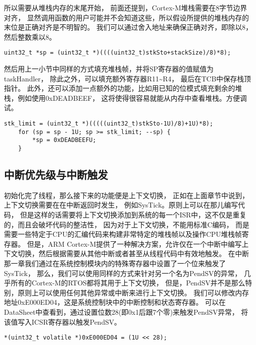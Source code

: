 所以需要从堆栈内存的末尾开始，
前面还提到，Cortex-M堆栈需要在8字节边界对齐，
显然调用函数的用户可能并不会知道这些，所以假设所提供的堆栈内存的末位是正确对齐是不明智的。
我们可以通过舍入地址来确保正确对齐，即除以8，然后整数乘以8。
\begin{lstlisting}[language={[ANSI]C},keywordstyle=\color{blue!70},commentstyle=\color{red!50!green!50!blue!50},frame=shadowbox, rulesepcolor=\color{red!20!green!20!blue!20}]
    uint32_t *sp = (uint32_t *)((((uint32_t)stkSto+stackSize)/8)*8);
\end{lstlisting}
然后用上一小节中同样的方式填充堆栈帧，并将SP寄存器的值赋值为taskHandler，
除此之外，可以填充额外寄存器R11\textasciitilde R4，
最后在TCB中保存栈顶指针。
此外，还可以添加一点额外的功能，比如用已知的位模式填充剩余的堆栈，例如使用0xDEADBEEF，
这将使得很容易就能从内存中查看堆栈。方便调试。
\begin{lstlisting}[language={[ANSI]C},keywordstyle=\color{blue!70},commentstyle=\color{red!50!green!50!blue!50},frame=shadowbox, rulesepcolor=\color{red!20!green!20!blue!20}]
    stk_limit = (uint32_t *)(((((uint32_t)stkSto-1U)/8)+1U)*8);
    for (sp = sp - 1U; sp >= stk_limit; --sp) {
        *sp = 0xDEADBEEFU;
    }
\end{lstlisting}

\subsection{中断优先级与中断触发}
初始化完了线程，那么接下来的功能便是上下文切换，
正如在上面章节中说到，上下文切换需要在在中断返回时发生，
例如SysTick。原则上可以在那儿编写代码，
但是这样的话需要将上下文切换添加到系统的每一个ISR中，这不仅是重复的，而且会破坏代码的整洁性，
因为对于上下文切换，不能用标准C编码，
而是需要一些特定于CPU的汇编代码来构建非常特定的堆栈帧以及操作CPU堆栈帧寄存器。
但是，ARM Cortex-M提供了一种解决方案，允许仅在一个中断中编写上下文切换，然后根据需要从其他中断或者甚至从线程代码中有效地触发。
在中断那一章我们通过在系统控制模块内的特殊寄存器中设置了一个位来触发了SysTick，
那么，我们可以使用同样的方式来针对另一个名为PendSV的异常，
几乎所有的Cortex-M的RTOS都将其用于上下文切换，
但是，PendSV并不是那么特别，原则上可以使用任何其他异常或中断来进行上下文切换。
我们可以修改内存地址0xE000ED04，这是系统控制块中的中断控制和状态寄存器。
可以在DataSheet中查看到，通过设置位数28(即0x1后跟7个零)来触发PendSV异常，
将该值写入ICSR寄存器以触发PendSV。
\begin{lstlisting}[language={[ANSI]C},keywordstyle=\color{blue!70},commentstyle=\color{red!50!green!50!blue!50},frame=shadowbox, rulesepcolor=\color{red!20!green!20!blue!20}]
    *(uint32_t volatile *)0xE000ED04 = (1U << 28);
\end{lstlisting}

